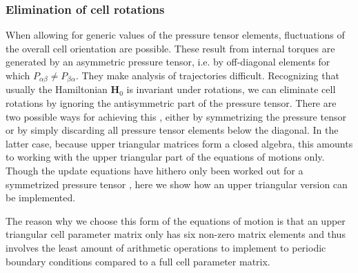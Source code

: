 \documentclass[12pt,letter]{article}
\renewcommand{\vec}[1]{\mathbf{#1}}
\begin{document}
\subsubsection{Elimination of cell rotations}
When allowing for generic values of the pressure tensor elements, fluctuations of the overall cell orientation are possible. These result from internal torques are generated by an asymmetric pressure tensor, i.e. by off-diagonal elements for which $P_{\alpha\beta} \ne P_{\beta \alpha}$. They make
analysis of trajectories difficult. Recognizing that usually the Hamiltonian $\vec H_0$ is invariant under rotations, we can eliminate cell rotations by ignoring the antisymmetric part of the pressure tensor. There are two possible ways for achieving this \cite{Martyna1994}, either by symmetrizing the pressure tensor or by simply discarding all pressure tensor elements below the diagonal. In the latter case, because upper triangular matrices form a closed algebra, this amounts to working with the upper triangular part of the equations of motions only. Though the update equations have hithero only been worked out for a symmetrized pressure tensor \cite{Martyna1994}, here we show how an upper triangular version can be implemented.

The reason why we choose this form of the equations of motion is that an upper triangular cell parameter matrix only has six non-zero matrix elements and thus involves the least amount of arithmetic operations to implement to periodic boundary conditions compared to a full cell parameter matrix.
\end{document}
